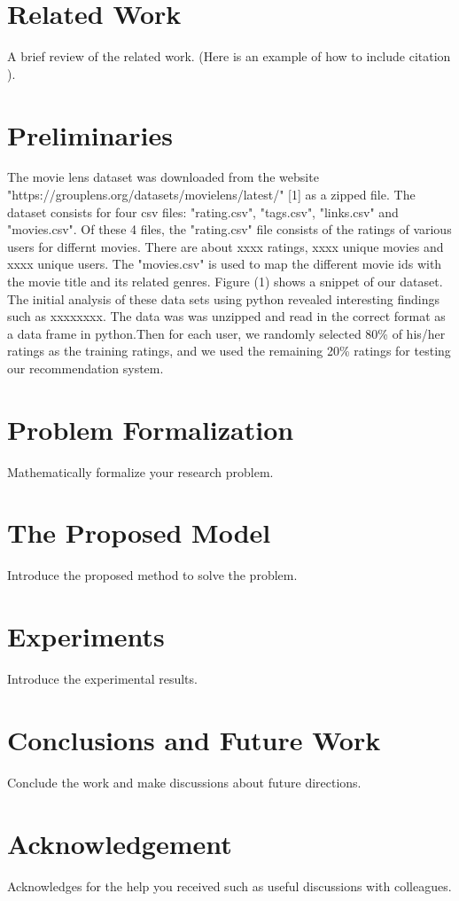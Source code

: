 \documentclass[sigconf]{acmart}
\begin{document}
\section{Related Work}\label{sec:related}
A brief review of the related work. (Here is an example of how to include citation \cite{koren2009matrix}).


\section{Preliminaries}\label{sec:preliminary}
The movie lens dataset was downloaded from the website "https://grouplens.org/datasets/movielens/latest/" [1] as a zipped file. The dataset consists for four csv files: "rating.csv", "tags.csv", "links.csv" and "movies.csv". Of these 4 files, the "rating.csv" file consists of the ratings of various users for differnt movies. There are about xxxx ratings, xxxx unique movies and xxxx unique users. The "movies.csv" is used to map the different movie ids with the movie title and its related genres. Figure (1) shows a snippet of our dataset. 
\\The initial analysis of these data sets using python revealed interesting findings such as xxxxxxxx.  The data was was unzipped and read in the correct format as a data frame in python.Then for each user, we randomly selected 80\% of his/her ratings as the training ratings, and we used the remaining 20\% ratings for testing our recommendation system.

\section{Problem Formalization}\label{sec:formal}
Mathematically formalize your research problem.

\section{The Proposed Model}\label{sec:framework}
Introduce the proposed method to solve the problem.

\section{Experiments}\label{sec:experiments}
Introduce the experimental results.

\section{Conclusions and Future Work}\label{sec:conclusions}
Conclude the work and make discussions about future directions.

\section*{Acknowledgement}
Acknowledges for the help you received such as useful discussions with colleagues.


\balance

\end{document}
